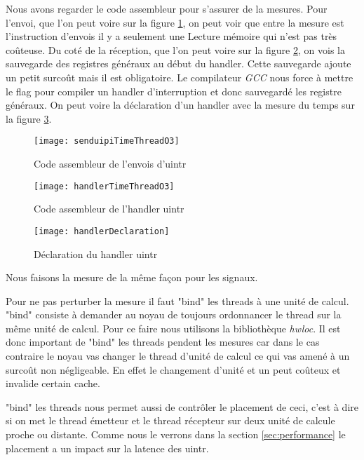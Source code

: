 Nous avons regarder le code assembleur pour s'assurer de la mesures.
Pour l'envoi, que l'on peut voire sur la figure \ref{fig:sendUintrAsm}, on peut voir que entre la mesure est l'instruction d'envois il y a seulement une Lecture mémoire qui n'est pas très coûteuse.
Du coté de la réception, que l'on peut voire sur la figure \ref{fig:handlerUintrAsm}, on vois la sauvegarde des registres généraux au début du handler.
Cette sauvegarde ajoute un petit surcoût mais il est obligatoire.
Le compilateur \emph{GCC} nous force à mettre le flag  pour compiler un handler d'interruption et donc sauvegardé les registre généraux.
On peut voire la déclaration d'un handler avec la mesure du temps sur la figure \ref{fig:unitrHandler}.
\begin{figure}[H]
  \texttt{[image: senduipiTimeThreadO3]}
  \caption{Code assembleur de l'envois d'uintr}
  \label{fig:sendUintrAsm}
\end{figure}

\begin{figure}[H]
  \texttt{[image: handlerTimeThreadO3]}
  \caption{Code assembleur de l'handler uintr}
  \label{fig:handlerUintrAsm}
\end{figure}

\begin{figure}[H]
  \centering
  \texttt{[image: handlerDeclaration]}
  \caption{Déclaration du handler uintr}
  \label{fig:unitrHandler}
\end{figure}

Nous faisons la mesure de la même façon pour les signaux.

Pour ne pas perturber la mesure il faut "bind" les threads à une unité de calcul.
"bind" consiste à demander au noyau de toujours ordonnancer le thread sur la même unité de calcul.
Pour ce faire nous utilisons la bibliothèque \emph{hwloc}. %
Il est donc important de "bind" les threads pendent les mesures car dans le cas contraire le noyau vas changer le thread d'unité de calcul ce qui vas amené à un surcoût non négligeable.
En effet le changement d'unité et un peut coûteux et invalide certain cache.

"bind" les threads nous permet aussi de contrôler le placement de ceci, c'est à dire si on met le thread émetteur et le thread récepteur sur deux unité de calcule proche ou distante.
Comme nous le verrons dans la section \ref{sec:performance} le placement a un impact sur la latence des uintr.

